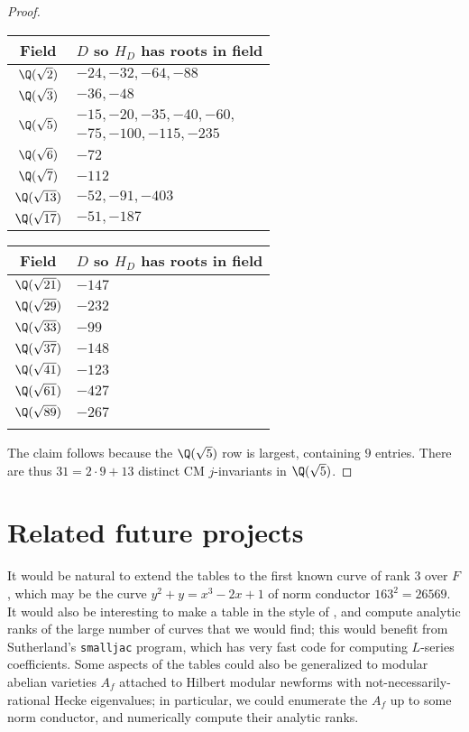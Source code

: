 \documentclass{amsart}
\begin{document}
\begin{proof}
\begin{center}
\begin{tabular}{|c|l|}\hline
Field & $D$ so $H_D$ has roots in field\\\hline
$\Q(\sqrt{2})$ & $-24,-32,-64,-88$ \\\hline
$\Q(\sqrt{3})$ & $-36,-48$ \\\hline
\multirow{2}{*}{$\Q(\sqrt{5})$} & $-15,-20,-35,-40,-60,$ \\
             & $-75,-100,-115,-235$\\\hline
$\Q(\sqrt{6})$ & $-72$ \\\hline
$\Q(\sqrt{7})$ & $-112$ \\\hline
$\Q(\sqrt{13})$ & $-52,-91,-403$ \\\hline
$\Q(\sqrt{17})$ & $-51,-187$ \\\hline
\end{tabular}
\begin{tabular}{|c|l|}\hline
Field & $D$ so $H_D$ has roots in field\\\hline
$\Q(\sqrt{21})$ & $-147$ \\\hline
$\Q(\sqrt{29})$ & $-232$ \\\hline
$\Q(\sqrt{33})$ & $-99$ \\\hline
$\Q(\sqrt{37})$ & $-148$ \\\hline
$\Q(\sqrt{41})$ & $-123$ \\\hline
$\Q(\sqrt{61})$ & $-427$ \\\hline
$\Q(\sqrt{89})$ & $-267$ \\\hline
& \\\hline
\end{tabular}
\end{center}
The claim follows because the $\Q(\sqrt{5})$ row is largest,
containing $9$ entries.  There are thus $31 = 2\cdot 9 + 13$ distinct CM $j$-invariants
in $\Q(\sqrt{5})$.

\end{proof}

\section{Related future projects}\label{sec:future}

It would be natural to extend the tables to the first known curve of
rank $3$ over $F$, which may be the curve $y^2 + y = x^3 -2x + 1$ of
norm conductor $163^2=26569$.  It would also be interesting to make a
table in the style of \cite{stein-watkins:ants5}, and compute analytic
ranks of the large number of curves that we would find; this would
benefit from Sutherland's {\tt smalljac} program, which has very fast code
for computing $L$-series coefficients.  Some aspects of the tables
could also be generalized to modular abelian varieties $A_f$ attached
to Hilbert modular newforms with not-necessarily-rational Hecke
eigenvalues; in particular, we could enumerate the $A_f$ up to some
norm conductor, and numerically compute their analytic ranks.
\end{document}
